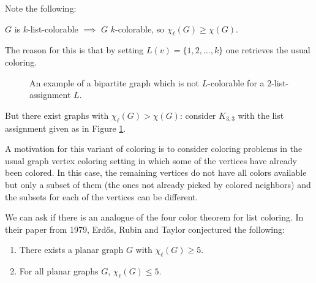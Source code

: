 Note the following:

\begin{observation}
$G$ is $k$-list-colorable $\implies$ $G$ $k$-colorable, so $\chi_{\ell}(G) \geq \chi(G)$.
\end{observation}

The reason for this is that by setting $L(v) = \{1, 2, \ldots, k\}$ one retrieves the usual coloring.

\begin{figure}

\centering
\begin{center}
\end{center}
\caption{An example of a bipartite graph which is not $L$-colorable for a $2$-list-assignment $L$.}
\label{fig:k33not2lcolorable}
\end{figure}

But there exist graphs with $\chi_{\ell}(G) > \chi(G)$: consider $K_{3, 3}$ with the list
assignment given as in Figure \ref{fig:k33not2lcolorable}.

A motivation for this variant of coloring is to consider coloring problems in the usual graph vertex
coloring setting in which some of the vertices have already been colored. In this case, the 
remaining vertices do not have all colors available but only a subset of them (the ones not already
picked by colored neighbors) and the subsets for each of the vertices can be different. 

We can ask if there is an analogue of the four color theorem for list coloring.
In their paper from 1979, Erdős, Rubin and Taylor conjectured the following:

\begin{conjecture}
\begin{enumerate}
	\item There exists a planar graph $G$ with $\chi_{\ell}(G) \geq 5$. 
	\item For all planar graphs $G$, $\chi_{\ell}(G) \leq 5$.
\end{enumerate}
\end{conjecture}

